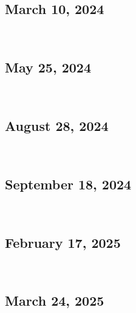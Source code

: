 \subsection{March 10, 2024}
\label{appendix:rf-mar-24}
\


\subsection{May 25, 2024}
\label{appendix:rf-may-24}
\


\subsection{August 28, 2024}
\label{appendix:rf-aug-24}
\


\subsection{September 18, 2024}
\label{appendix:rf-sep-24}
\


\subsection{February 17, 2025}
\label{appendix:rf-feb-25}
\


\subsection{March 24, 2025}
\label{appendix:rf-mar-25}
\


